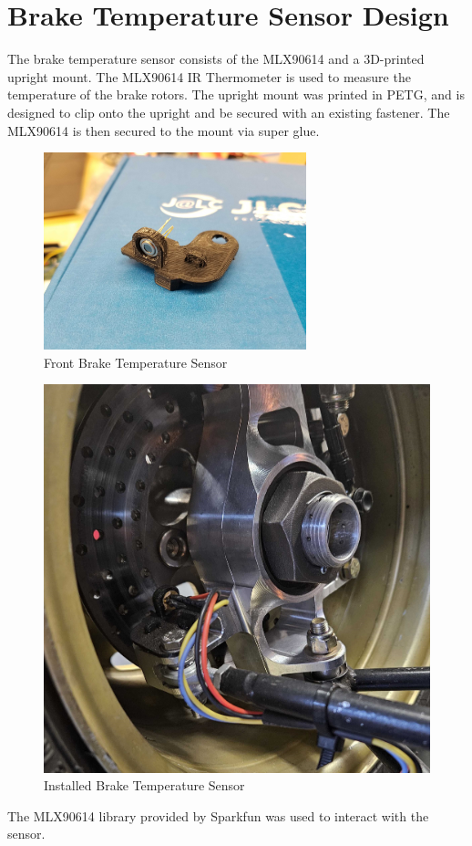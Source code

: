 \section{Brake Temperature Sensor Design}
The brake temperature sensor consists of the MLX90614 and a 3D-printed upright mount.
The MLX90614 IR Thermometer is used to measure the temperature of the brake rotors.
The upright mount was printed in PETG, and is designed to clip onto the upright and be secured with an existing fastener.
The MLX90614 is then secured to the mount via super glue.
\begin{figure}[H]
    \centering
    \includegraphics[width=3in]{images/brakes.jpg}
    \caption{Front Brake Temperature Sensor}
    \label{fig:fbts}
\end{figure}
\begin{figure}[H]
    \centering
    \includegraphics[width=5in]{images/brak.jpg}
    \caption{Installed Brake Temperature Sensor}
    \label{fig:ifbts}
\end{figure}
The MLX90614 library provided by Sparkfun was used to interact with the sensor.
